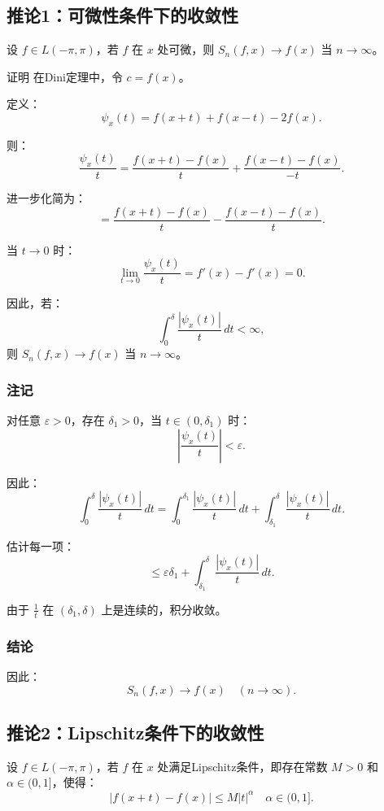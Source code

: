 \documentclass[12pt]{article}
\begin{document}
	\subsection{推论1：可微性条件下的收敛性}
	
	设 \( f \in L(-\pi, \pi) \)，若 \( f \) 在 \( x \) 处可微，则 \( S_n(f, x) \to f(x) \) 当 \( n \to \infty \)。
	
证明
	在Dini定理中，令 \( c = f(x) \)。
	
	定义：
	\[
	\psi_x(t) = f(x+t) + f(x-t) - 2f(x).
	\]
	
	则：
	\[
	\frac{\psi_x(t)}{t} = \frac{f(x+t) - f(x)}{t} + \frac{f(x-t) - f(x)}{-t}.
	\]
	
	进一步化简为：
	\[
	= \frac{f(x+t) - f(x)}{t} - \frac{f(x-t) - f(x)}{t}.
	\]
	
	当 \( t \to 0 \) 时：
	\[
	\lim_{t \to 0} \frac{\psi_x(t)}{t} = f'(x) - f'(x) = 0.
	\]
	
	因此，若：
	\[
	\int_0^\delta \frac{|\psi_x(t)|}{t} \, dt < \infty,
	\]
	则 \( S_n(f, x) \to f(x) \) 当 \( n \to \infty \)。
	
	\subsubsection{注记}
	
	对任意 \(\varepsilon > 0\)，存在 \(\delta_1 > 0\)，当 \( t \in (0, \delta_1) \) 时：
	\[
	\left| \frac{\psi_x(t)}{t} \right| < \varepsilon.
	\]
	
	因此：
	\[
	\int_0^\delta \frac{|\psi_x(t)|}{t} \, dt = \int_0^{\delta_1} \frac{|\psi_x(t)|}{t} \, dt + \int_{\delta_1}^\delta \frac{|\psi_x(t)|}{t} \, dt.
	\]
	
	估计每一项：
	\[
	\leq \varepsilon \delta_1 + \int_{\delta_1}^\delta \frac{|\psi_x(t)|}{t} \, dt.
	\]
	
	由于 \(\frac{1}{t}\) 在 \((\delta_1, \delta)\) 上是连续的，积分收敛。
	
\subsubsection{结论}
	
	因此：
	\[
	S_n(f, x) \to f(x) \quad (n \to \infty).
	\]
	
	\subsection{推论2：Lipschitz条件下的收敛性}
	
	设 \( f \in L(-\pi, \pi) \)，若 \( f \) 在 \( x \) 处满足Lipschitz条件，即存在常数 \( M > 0 \) 和 \( \alpha \in (0, 1] \)，使得：
	\[
	|f(x+t) - f(x)| \leq M |t|^\alpha \quad  \alpha \in (0, 1].
	\]
	
\end{document}
